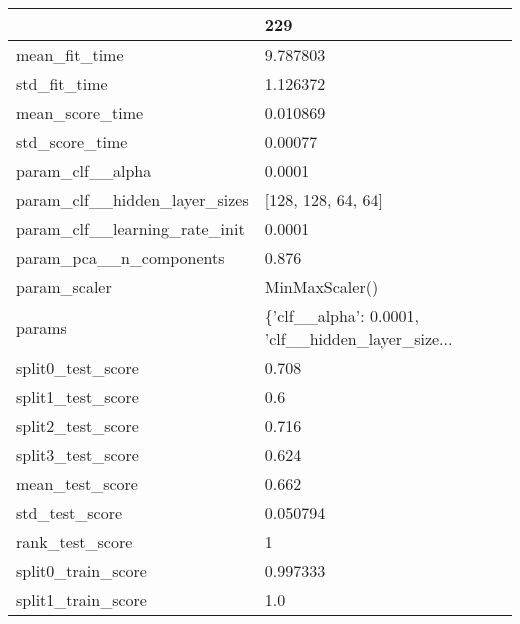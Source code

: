 \begin{tabular}{ll}
\toprule
{} &                                                229 \\
\midrule
mean\_fit\_time                 &                                           9.787803 \\
std\_fit\_time                  &                                           1.126372 \\
mean\_score\_time               &                                           0.010869 \\
std\_score\_time                &                                            0.00077 \\
param\_clf\_\_alpha              &                                             0.0001 \\
param\_clf\_\_hidden\_layer\_sizes &                                 [128, 128, 64, 64] \\
param\_clf\_\_learning\_rate\_init &                                             0.0001 \\
param\_pca\_\_n\_components       &                                              0.876 \\
param\_scaler                  &                                     MinMaxScaler() \\
params                        &  \{'clf\_\_alpha': 0.0001, 'clf\_\_hidden\_layer\_size... \\
split0\_test\_score             &                                              0.708 \\
split1\_test\_score             &                                                0.6 \\
split2\_test\_score             &                                              0.716 \\
split3\_test\_score             &                                              0.624 \\
mean\_test\_score               &                                              0.662 \\
std\_test\_score                &                                           0.050794 \\
rank\_test\_score               &                                                  1 \\
split0\_train\_score            &                                           0.997333 \\
split1\_train\_score            &                                                1.0 \\

\end{tabular}

